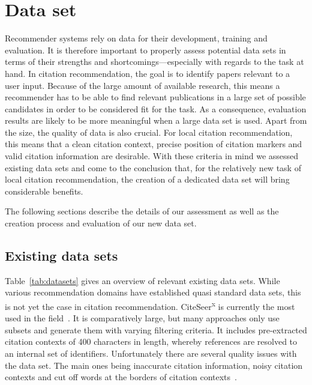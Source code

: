 \chapter{Data set}\label{chap:dataset}
Recommender systems rely on data for their development, training and evaluation. It is therefore important to properly assess potential data sets in terms of their strengths and shortcomings---especially with regards to the task at hand. In citation recommendation, the goal is to identify papers relevant to a user input. Because of the large amount of available research, this means a recommender has to be able to find relevant publications in a large set of possible candidates in order to be considered fit for the task. As a consequence, evaluation results are likely to be more meaningful when a large data set is used. Apart from the size, the quality of data is also crucial. For local citation recommendation, this means that a clean citation context, precise position of citation markers and valid citation information are desirable. With these criteria in mind we assessed existing data sets and come to the conclusion that, for the relatively new task of local citation recommendation, the creation of a dedicated data set will bring considerable benefits.

The following sections describe the details of our assessment as well as the creation process and evaluation of our new data set.

\section{Existing data sets}

Table~\ref{tab:datasets} gives an overview of relevant existing data sets. While various recommendation domains have established quasi standard data sets, this is not yet the case in citation recommendation. CiteSeer\textsuperscript{x} is currently the most used in the field~\cite{Beel2016}. It is comparatively large, but many approaches only use subsets and generate them with varying filtering criteria. It includes pre-extracted citation contexts of 400 characters in length, whereby references are resolved to an internal set of identifiers. Unfortunately there are several quality issues with the data set. The main ones being inaccurate citation information, noisy citation contexts and cut off words at the borders of citation contexts~\cite{Roy2016}.


